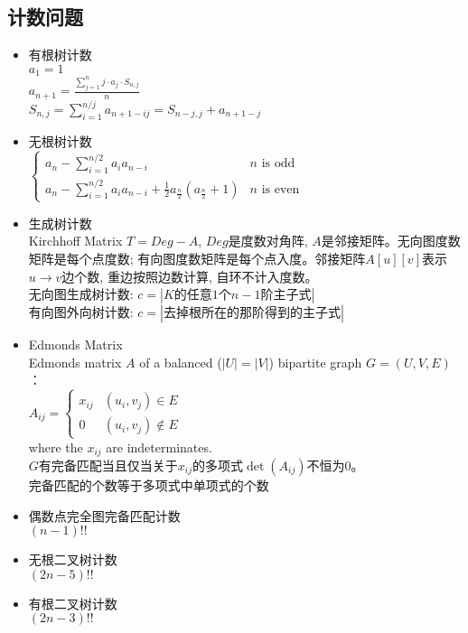 	\subsection*{计数问题}
		\begin{itemize}[nosep,wide=0pt]
			\item 有根树计数
				\\$ a_1 = 1 $
				\\$ a_{n + 1} = \frac{\sum\limits_{j = 1}^{n} j \cdot a_j \cdot S_{n, j}}{n} $
				\\$ S_{n, j} = \sum\limits_{i = 1}^{n / j} a_{n + 1 - ij} = S_{n - j, j} + a_{n + 1 - j} $
			\item 无根树计数
				\\$ \begin{cases}
					a_n - \sum\limits_{i = 1}^{n / 2} a_i a_{n - i} & n \text{ is odd}\\
					a_n - \sum\limits_{i = 1}^{n / 2} a_i a_{n - i} + \frac{1}{2} a_{\frac{n}{2}} (a_{\frac{n}{2}} + 1) & n \text{ is even}
				\end{cases} $
			\item 生成树计数
				\\Kirchhoff Matrix $ T = Deg − A $, $ Deg $是度数对角阵, $ A $是邻接矩阵。无向图度数矩阵是每个点度数; 有向图度数矩阵是每个点入度。邻接矩阵$ A[u][v] $表示$ u \to v $边个数, 重边按照边数计算, 自环不计入度数。
				\\无向图生成树计数: $ c = \left|K\text{的任意}1\text{个}n−1\text{阶主子式}\right| $
				\\有向图外向树计数: $ c = \left|\text{去掉根所在的那阶得到的主子式}\right| $
			\item Edmonds Matrix
				\\Edmonds matrix $ A $ of a balanced ($ \left| U \right| = \left| V \right| $) bipartite graph $ G = (U, V, E) $：
				\\$ A_{ij} = \begin{cases}
					x_{ij} & (u_i, v_j) \in E\\
					0 & (u_i, v_j) \notin E
				\end{cases} $
				\\where the $ x_{ij} $ are indeterminates.
				\\$ G $有完备匹配当且仅当关于$ x_{ij} $的多项式$ \det(A_{ij}) $不恒为$ 0 $。
				\\完备匹配的个数等于多项式中单项式的个数
			\item 偶数点完全图完备匹配计数
				\\$ (n - 1)!! $
			\item 无根二叉树计数
				\\$ (2n - 5)!! $
			\item 有根二叉树计数
				\\$ (2n - 3)!! $
		\end{itemize}
